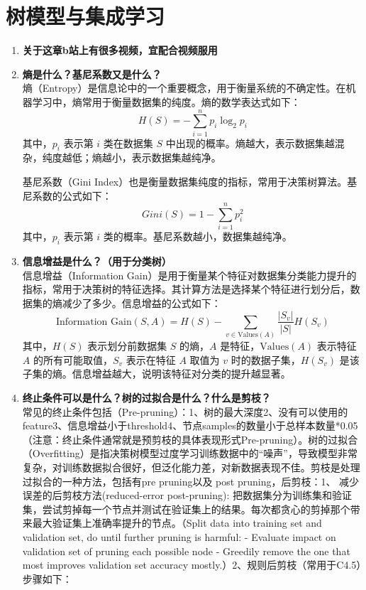 \documentclass{article}
\begin{document}
\section{树模型与集成学习}
\begin{enumerate}
\item \textbf{关于这章b站上有很多视频，宜配合视频服用}\\
\item \textbf{熵是什么？基尼系数又是什么？}\\
熵（Entropy）是信息论中的一个重要概念，用于衡量系统的不确定性。在机器学习中，熵常用于衡量数据集的纯度。熵的数学表达式如下：
$$
H(S) = -\sum_{i=1}^{n} p_i \log_2 p_i
$$
其中，$p_i$ 表示第 $i$ 类在数据集 $S$ 中出现的概率。熵越大，表示数据集越混杂，纯度越低；熵越小，表示数据集越纯净。

基尼系数（Gini Index）也是衡量数据集纯度的指标，常用于决策树算法。基尼系数的公式如下：
$$
Gini(S) = 1 - \sum_{i=1}^{n} p_i^2
$$
其中，$p_i$ 表示第 $i$ 类的概率。基尼系数越小，数据集越纯净。
\item \textbf{信息增益是什么？（用于分类树）}\\
信息增益（Information Gain）是用于衡量某个特征对数据集分类能力提升的指标，常用于决策树的特征选择。其计算方法是选择某个特征进行划分后，数据集的熵减少了多少。信息增益的公式如下：
$$
\text{Information Gain}(S, A) = H(S) - \sum_{v \in \text{Values}(A)} \frac{|S_v|}{|S|} H(S_v)
$$
其中，$H(S)$ 表示划分前数据集 $S$ 的熵，$A$ 是特征，$\text{Values}(A)$ 表示特征 $A$ 的所有可能取值，$S_v$ 表示在特征 $A$ 取值为 $v$ 时的数据子集，$H(S_v)$ 是该子集的熵。信息增益越大，说明该特征对分类的提升越显著。
\item \textbf{终止条件可以是什么？树的过拟合是什么？什么是剪枝？}\\
常见的终止条件包括（Pre-pruning）：1、树的最大深度2、没有可以使用的feature3、信息增益小于threshold4、节点samples的数量小于总样本数量*0.05（注意：终止条件通常就是预剪枝的具体表现形式Pre-pruning）。树的过拟合（Overfitting）是指决策树模型过度学习训练数据中的“噪声”，导致模型非常复杂，对训练数据拟合很好，但泛化能力差，对新数据表现不佳。剪枝是处理过拟合的一种方法，包括有pre pruning以及 post pruning，后剪枝：1、 减少误差的后剪枝方法(reduced-error post-pruning): 把数据集分为训练集和验证集，尝试剪掉每一个节点并测试在验证集上的结果。每次都贪心的剪掉那个带来最大验证集上准确率提升的节点。（Split data into training set and validation set, do until further pruning is harmful: - Evaluate impact on validation set of pruning each possible node - Greedily remove the one that most improves validation set accuracy mostly.）2、规则后剪枝（常用于C4.5）步骤如下：


\end{enumerate}
\end{document}
